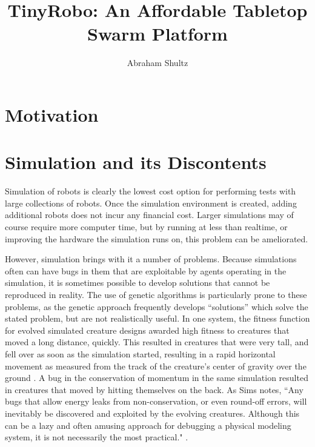 \documentclass[]{article}
\title{TinyRobo: An Affordable Tabletop Swarm Platform}
\author{Abraham Shultz}
\begin{document}
\maketitle

\begin{abstract}

\end{abstract}

\section{Motivation}

\section{Simulation and its Discontents}

Simulation of robots is clearly the lowest cost option for performing tests with large collections of robots. 
Once the simulation environment is created, adding additional robots does not incur any financial cost. 
Larger simulations may of course require more computer time, but by running at less than realtime, or improving the hardware the simulation runs on, this problem can be ameliorated. 

However, simulation brings with it a number of problems. 
Because simulations often can have bugs in them that are exploitable by agents operating in the simulation, it is sometimes possible to develop solutions that cannot be reproduced in reality. 
The use of genetic algorithms is particularly prone to these problems, as the genetic approach frequently develops ``solutions'' which solve the stated problem, but are not realistically useful. 
In one system, the fitness function for evolved simulated creature designs awarded high fitness to creatures that moved a long distance, quickly. 
This resulted in creatures that were very tall, and fell over as soon as the simulation started, resulting in a rapid horizontal movement as measured from the track of the creature's center of gravity over the ground \cite{brooks2000artificial, sims1994evolving}. 
A bug in the conservation of momentum in the same simulation resulted in creatures that moved by hitting themselves on the back. 
As Sims notes, ``Any bugs that allow energy leaks from non-conservation, or even round-off errors, will inevitably be discovered and exploited by the
evolving creatures. Although this can be a lazy and often amusing approach for debugging a physical modeling system, it is not necessarily the most practical." \cite{sims1994evolving}.
\end{document}
